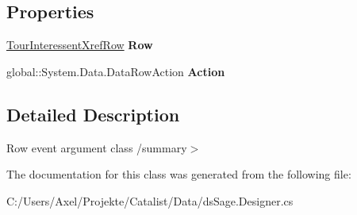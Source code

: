 \subsection*{Properties}
\begin{DoxyCompactItemize}
\item 
\hyperlink{class_products_1_1_data_1_1ds_sage_1_1_tour_interessent_xref_row}{Tour\+Interessent\+Xref\+Row} {\bfseries Row}\hypertarget{class_products_1_1_data_1_1ds_sage_1_1_tour_interessent_xref_row_change_event_a29fcd54aa6011f1a2571fe44097e1c0a}{}\label{class_products_1_1_data_1_1ds_sage_1_1_tour_interessent_xref_row_change_event_a29fcd54aa6011f1a2571fe44097e1c0a}

\item 
global\+::\+System.\+Data.\+Data\+Row\+Action {\bfseries Action}\hypertarget{class_products_1_1_data_1_1ds_sage_1_1_tour_interessent_xref_row_change_event_a2ef2db5823d383c4e12d221c02c5e955}{}\label{class_products_1_1_data_1_1ds_sage_1_1_tour_interessent_xref_row_change_event_a2ef2db5823d383c4e12d221c02c5e955}

\end{DoxyCompactItemize}


\subsection{Detailed Description}
Row event argument class /summary$>$ 

The documentation for this class was generated from the following file\+:\begin{DoxyCompactItemize}
\item 
C\+:/\+Users/\+Axel/\+Projekte/\+Catalist/\+Data/ds\+Sage.\+Designer.\+cs\end{DoxyCompactItemize}
